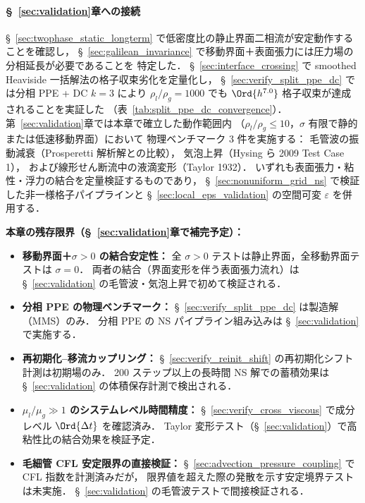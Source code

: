 \paragraph{§~\ref{sec:validation}章への接続}

§~\ref{sec:twophase_static_longterm} で低密度比の静止界面二相流が安定動作することを確認し，
§~\ref{sec:galilean_invariance} で移動界面＋表面張力には圧力場の分相延長が必要であることを
特定した．
§~\ref{sec:interface_crossing} で smoothed Heaviside 一括解法の格子収束劣化を定量化し，
§~\ref{sec:verify_split_ppe_dc} では分相 PPE + DC $k{=}3$ により
$\rho_l/\rho_g = 1000$ でも $\Ord{h^{7.0}}$ 格子収束が達成されることを実証した
（表~\ref{tab:split_ppe_dc_convergence}）．
第~\ref{sec:validation}章では本章で確立した動作範囲内
（$\rho_l/\rho_g \leq 10$，$\sigma$ 有限で静的または低速移動界面）において
物理ベンチマーク 3 件を実施する：
毛管波の振動減衰（Prosperetti 解析解との比較），
気泡上昇（Hysing ら 2009 Test Case 1），
および線形せん断流中の液滴変形（Taylor 1932）．
いずれも表面張力・粘性・浮力の結合を定量検証するものであり，
§~\ref{sec:nonuniform_grid_ns} で検証した非一様格子パイプラインと
§~\ref{sec:local_eps_validation} の空間可変 $\varepsilon$ を併用する．

\noindent\textbf{本章の残存限界（§~\ref{sec:validation}章で補完予定）：}
\begin{itemize}[noitemsep]
  \item \textbf{移動界面＋$\sigma > 0$ の結合安定性：}
        全 $\sigma > 0$ テストは静止界面，全移動界面テストは $\sigma = 0$．
        両者の結合（界面変形を伴う表面張力流れ）は
        §~\ref{sec:validation} の毛管波・気泡上昇で初めて検証される．
  \item \textbf{分相 PPE の物理ベンチマーク：}
        §~\ref{sec:verify_split_ppe_dc} は製造解（MMS）のみ．
        分相 PPE の NS パイプライン組み込みは §~\ref{sec:validation} で実施する．
  \item \textbf{再初期化--移流カップリング：}
        §~\ref{sec:verify_reinit_shift} の再初期化シフト計測は初期場のみ．
        200 ステップ以上の長時間 NS 解での蓄積効果は
        §~\ref{sec:validation} の体積保存計測で検出される．
  \item \textbf{$\mu_l/\mu_g \gg 1$ のシステムレベル時間精度：}
        §~\ref{sec:verify_cross_viscous} で成分レベル $\Ord{\Delta t}$ を確認済み．
        Taylor 変形テスト（§~\ref{sec:validation}）で高粘性比の結合効果を検証予定．
  \item \textbf{毛細管 CFL 安定限界の直接検証：}
        §~\ref{sec:advection_pressure_coupling} で CFL 指数を計測済みだが，
        限界値を超えた際の発散を示す安定境界テストは未実施．
        §~\ref{sec:validation} の毛管波テストで間接検証される．
\end{itemize}

